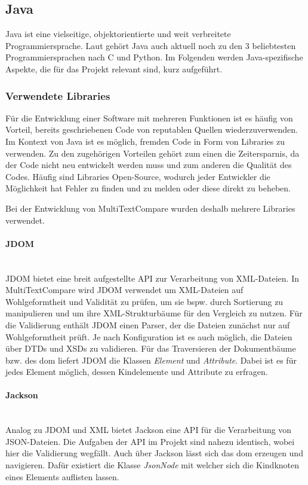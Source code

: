 \newpage
\subsection{Java}
Java ist eine vielseitige, objektorientierte und weit verbreitete Programmiersprache. Laut \autocite{tiobe} gehört Java auch aktuell noch zu den 3 beliebtesten Programmiersprachen nach C und Python. Im Folgenden werden Java-spezifische Aspekte, die für das Projekt relevant sind, kurz aufgeführt. 

\subsubsection{Verwendete Libraries}

Für die Entwicklung einer Software mit mehreren Funktionen ist es häufig von Vorteil, bereits geschriebenen Code von reputablen Quellen wiederzuverwenden. Im Kontext von Java ist es möglich, fremden Code in Form von Libraries zu verwenden. Zu den zugehörigen Vorteilen gehört zum einen die Zeitersparnis, da der Code nicht neu entwickelt werden muss und zum anderen die Qualität des Codes. Häufig sind Libraries Open-Source, wodurch jeder Entwickler die Möglichkeit hat Fehler zu finden und zu melden oder diese direkt zu beheben. 

Bei der Entwicklung von MultiTextCompare wurden deshalb mehrere Libraries verwendet. 

\paragraph{JDOM}\mbox{}\\
JDOM bietet eine breit aufgestellte API zur Verarbeitung von XML-Dateien. In MultiTextCompare wird JDOM verwendet um XML-Dateien auf Wohlgeformtheit und Validität zu prüfen, um sie bspw. durch Sortierung zu manipulieren und um ihre XML-Strukturbäume für den Vergleich zu nutzen. Für die Validierung enthält JDOM einen Parser, der die Dateien zunächst nur auf Wohlgeformtheit prüft. Je nach Konfiguration ist es auch möglich, die Dateien über DTDs und XSDs zu validieren. Für das Traversieren der Dokumentbäume bzw. des \acrfull{dom} liefert JDOM die Klassen \textit{Element} und \textit{Attribute}. Dabei ist es für jedes Element möglich, dessen Kindelemente und Attribute zu erfragen.

\paragraph{Jackson}\mbox{}\\
Analog zu JDOM und XML bietet Jackson eine API für die Verarbeitung von JSON-Dateien. Die Aufgaben der API im Projekt sind nahezu identisch, wobei hier die Validierung wegfällt. Auch über Jackson lässt sich das \acrshort{dom} erzeugen und navigieren. Dafür existiert die Klasse \textit{JsonNode} mit welcher sich die Kindknoten eines Elements auflisten lassen.

